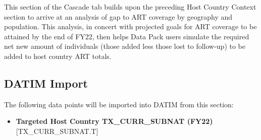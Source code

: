 \documentclass[
  openany]{book}
\providecommand{\tightlist}{%
  \setlength{\itemsep}{0pt}\setlength{\parskip}{0pt}}
\begin{document}
\begin{table}[H]
\centering\begingroup\fontsize{12}{14}\selectfont

\endgroup{}
\end{table}

This section of the Cascade tab builds upon the preceding Host Country
Context section to arrive at an analysis of gap to ART coverage by
geography and population. This analysis, in concert with projected goals
for ART coverage to be attained by the end of FY22, then helps Data Pack
users simulate the required net new amount of individuals (those added
less those lost to follow-up) to be added to host country ART totals.

\hypertarget{datim-import-2}{%
\subsection{DATIM Import}\label{datim-import-2}}

The following data points will be imported into DATIM from this section:

\begin{itemize}
\tightlist
\item
  \textbf{Targeted Host Country TX\_CURR\_SUBNAT (FY22)} {[}TX\_CURR\_SUBNAT.T{]}
\end{itemize}
\end{document}

